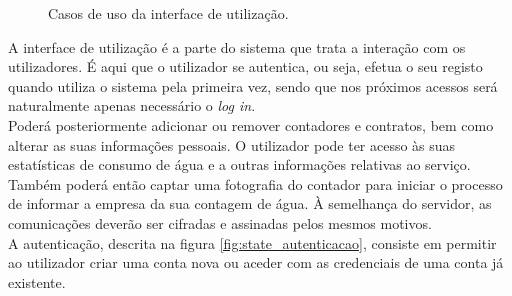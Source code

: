 \begin{figure}[h!]
\begin{center}
\caption{Casos de uso da interface de utilização.}
\label{fig:uso_iu}
\end{center}
\end{figure}

A interface de utilização é a parte do sistema que trata a interação com os utilizadores. É aqui que o utilizador se autentica, ou seja, efetua o seu registo quando utiliza o sistema pela primeira vez, sendo que nos próximos acessos será naturalmente apenas necessário o {\textit{log in}}.\\
Poderá posteriormente adicionar ou remover contadores e contratos, bem como alterar as suas informações pessoais. O utilizador pode ter acesso às suas estatísticas de consumo de água e a outras informações relativas ao serviço.\\
Também poderá então captar uma fotografia do contador para iniciar o processo de informar a empresa da sua contagem de água. À semelhança do servidor, as comunicações deverão ser cifradas e assinadas pelos mesmos motivos.\\

A autenticação, descrita na figura \ref{fig:state_autenticacao}, consiste em permitir ao utilizador criar uma conta nova ou aceder com as credenciais de uma conta já existente.

